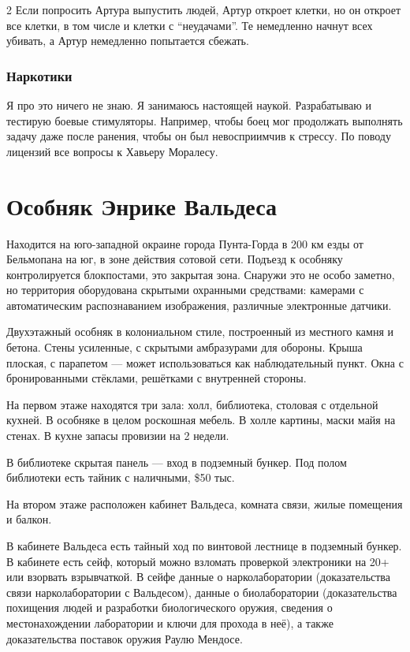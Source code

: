 \documentclass[twoside]{article}
\begin{document}
\begin{multicols}{2}
Если попросить Артура выпустить людей, Артур откроет клетки, но он
откроет все клетки, в том числе и клетки с \enquote{неудачами}. Те немедленно
начнут всех убивать, а Артур немедленно попытается сбежать.

\subsubsection{Наркотики}\label{narcotics-kron}

Я про это ничего не знаю. Я занимаюсь настоящей наукой. Разрабатываю и
тестирую боевые стимуляторы. Например, чтобы боец мог продолжать
выполнять задачу даже после ранения, чтобы он был невосприимчив к
стрессу. По поводу лицензий все вопросы к Хавьеру Моралесу.

\section{Особняк Энрике Вальдеса}\label{enrique-valdes-mansion}

Находится на юго-западной окраине города Пунта-Горда в 200 км езды от
Бельмопана на юг, в зоне действия сотовой сети. Подъезд к особняку
контролируется блокпостами, это закрытая зона. Снаружи это не особо
заметно, но территория оборудована скрытыми охранными средствами:
камерами с автоматическим распознаванием изображения, различные
электронные датчики.

Двухэтажный особняк в колониальном стиле, построенный из местного камня
и бетона. Стены усиленные, с скрытыми амбразурами для обороны. Крыша
плоская, с парапетом --- может использоваться как наблюдательный пункт.
Окна с бронированными стёклами, решётками с внутренней стороны.

На первом этаже находятся три зала: холл, библиотека, столовая с
отдельной кухней. В особняке в целом роскошная мебель. В холле картины,
маски майя на стенах. В кухне запасы провизии на 2 недели.

В библиотеке скрытая панель --- вход в подземный бункер. Под полом
библиотеки есть тайник с наличными, \$50 тыс.

На втором этаже расположен кабинет Вальдеса, комната связи, жилые
помещения и балкон.

В кабинете Вальдеса есть тайный ход по винтовой лестнице в подземный
бункер. В кабинете есть сейф, который можно взломать проверкой
электроники на 20+ или взорвать взрывчаткой. В сейфе данные о
нарколаборатории (доказательства связи нарколаборатории с Вальдесом),
данные о биолаборатории (доказательства похищения людей и разработки
биологического оружия, сведения о местонахождении лаборатории и ключи
для прохода в неё), а также доказательства поставок оружия Раулю
Мендосе.


\end{multicols}
\end{document}
